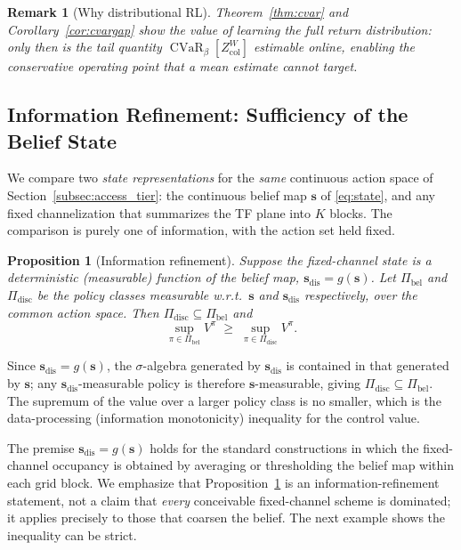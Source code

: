 \documentclass[journal]{IEEEtran}
\newtheorem{proposition}{Proposition}
\newtheorem{remark}{Remark}
\newcommand{\state}{\bm{s}}                %
\newcommand{\pol}{\pi}                     %
\newcommand{\Vfun}{V}                      %
\newcommand{\PIbel}{\Pi_{\mathrm{bel}}}    %
\newcommand{\PIdis}{\Pi_{\mathrm{disc}}}   %
\newcommand{\Zcol}{Z_{\mathrm{col}}}        %
\DeclareMathOperator{\CVaR}{CVaR}
\newcommand{\cvarcol}{\beta}                %
\begin{document}
\begin{remark}[Why distributional RL]
Theorem~\ref{thm:cvar} and Corollary~\ref{cor:cvargap} show the value of
learning the full return distribution: only then is the tail quantity
$\CVaR_{\cvarcol}[\Zcol^{W}]$ estimable online, enabling the conservative
operating point that a mean estimate cannot target.
\end{remark}

\subsection{Information Refinement: Sufficiency of the Belief State}
\label{subsec:thmB}
We compare two \emph{state representations} for the \emph{same} continuous
action space of Section~\ref{subsec:access_tier}: the continuous belief map
$\state$ of \eqref{eq:state}, and any fixed channelization that summarizes
the TF plane into $K$ blocks. The comparison is purely one of information,
with the action set held fixed.

\begin{proposition}[Information refinement]
\label{thm:sufficiency}
Suppose the fixed-channel state is a deterministic (measurable) function of
the belief map, $\state_{\mathrm{dis}}=g(\state)$. Let $\PIbel$ and $\PIdis$
be the policy classes measurable w.r.t.\ $\state$ and $\state_{\mathrm{dis}}$
respectively, over the common action space. Then
$\PIdis\subseteq\PIbel$ and
\begin{equation}
\sup_{\pol\in\PIbel}\Vfun^{\pol}\;\ge\;\sup_{\pol\in\PIdis}\Vfun^{\pol}.
\end{equation}
\end{proposition}

\begin{IEEEproof}
Since $\state_{\mathrm{dis}}=g(\state)$, the $\sigma$-algebra generated by
$\state_{\mathrm{dis}}$ is contained in that generated by $\state$; any
$\state_{\mathrm{dis}}$-measurable policy is therefore $\state$-measurable,
giving $\PIdis\subseteq\PIbel$. The supremum of the value over a larger
policy class is no smaller, which is the data-processing (information
monotonicity) inequality for the control value.
\end{IEEEproof}

The premise $\state_{\mathrm{dis}}=g(\state)$ holds for the standard
constructions in which the fixed-channel occupancy is obtained by averaging
or thresholding the belief map within each grid block. We emphasize that
Proposition~\ref{thm:sufficiency} is an information-refinement statement,
not a claim that \emph{every} conceivable fixed-channel scheme is dominated;
it applies precisely to those that coarsen the belief. The next example shows
the inequality can be strict.
\end{document}
